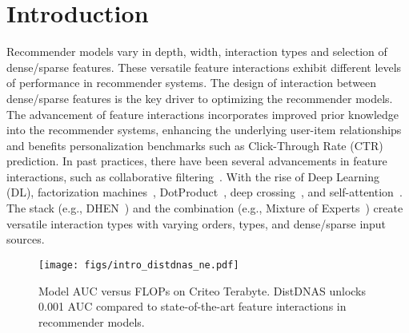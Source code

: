 \section{Introduction}
Recommender models vary in depth, width, interaction types and selection of dense/sparse features. These versatile feature interactions exhibit different levels of performance in recommender systems. 
The design of interaction between dense/sparse features is the key driver to optimizing the recommender models. 
The advancement of feature interactions incorporates improved prior knowledge into the recommender systems, enhancing the underlying user-item relationships and benefits personalization benchmarks such as Click-Through Rate (CTR) prediction.
In past practices, there have been several advancements in feature interactions, such as collaborative filtering~\cite{barkan2016item2vec,wang2016structural,he2017neural,zhang2017collaborative}.
With the rise of Deep Learning (DL), factorization machines~\cite{guo2017deepfm,lian2018xdeepfm}, DotProduct~\cite{cheng2016wide,naumov2019deep}, deep crossing~\cite{wang2021dcn}, and self-attention~\cite{song2019autoint}.
The stack (e.g., DHEN~\cite{zhang2022dhen}) and the combination (e.g., Mixture of Experts~\cite{masoudnia2014mixture,balog2006formal}) create versatile interaction types with varying orders, types, and dense/sparse input sources.


\begin{figure}[t]
    \begin{center}
    \texttt{[image: figs/intro\_distdnas\_ne.pdf]}
    \caption{Model AUC versus FLOPs on Criteo Terabyte. DistDNAS unlocks 0.001 AUC compared to state-of-the-art feature interactions in recommender models.}
    \label{fig:distdnas_sota}
    \end{center}
    \vspace{-1em}
\end{figure}

